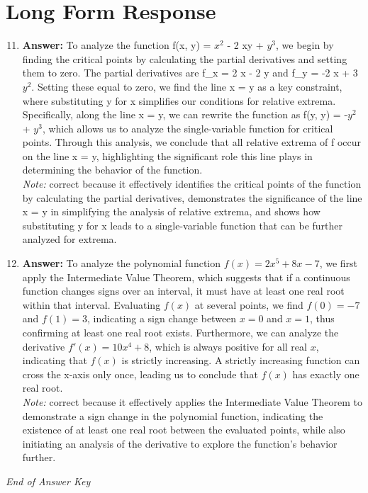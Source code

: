 \documentclass[12pt]{article}
\begin{document}
\section*{Long Form Response}
\begin{enumerate}[label=\arabic*.]
\setcounter{enumi}{10}
\item \textbf{Answer:} To analyze the function f(x, y) = $x^2$ - 2 xy + $y^3$, we begin by finding the critical points by calculating the partial derivatives and setting them to zero. The partial derivatives are f\_x = 2 x - 2 y and f\_y = -2 x + 3 $y^2$. Setting these equal to zero, we find the line x = y as a key constraint, where substituting y for x simplifies our conditions for relative extrema. Specifically, along the line x = y, we can rewrite the function as f(y, y) = -$y^2$ + $y^3$, which allows us to analyze the single-variable function for critical points. Through this analysis, we conclude that all relative extrema of f occur on the line x = y, highlighting the significant role this line plays in determining the behavior of the function.
\\ \textit{Note:} correct because it effectively identifies the critical points of the function by calculating the partial derivatives, demonstrates the significance of the line x = y in simplifying the analysis of relative extrema, and shows how substituting y for x leads to a single-variable function that can be further analyzed for extrema.
\item \textbf{Answer:} To analyze the polynomial function \( f(x) = 2 x^5 + 8 x - 7 \), we first apply the Intermediate Value Theorem, which suggests that if a continuous function changes signs over an interval, it must have at least one real root within that interval. Evaluating \( f(x) \) at several points, we find \( f(0) = -7 \) and \( f(1) = 3 \), indicating a sign change between \( x = 0 \) and \( x = 1 \), thus confirming at least one real root exists. Furthermore, we can analyze the derivative \( f'(x) = 10 x^4 + 8 \), which is always positive for all real \( x \), indicating that \( f(x) \) is strictly increasing. A strictly increasing function can cross the x-axis only once, leading us to conclude that \( f(x) \) has exactly one real root.
\\ \textit{Note:} correct because it effectively applies the Intermediate Value Theorem to demonstrate a sign change in the polynomial function, indicating the existence of at least one real root between the evaluated points, while also initiating an analysis of the derivative to explore the function's behavior further.
\end{enumerate}

\vfill
\noindent\textit{End of Answer Key}
\end{document}
